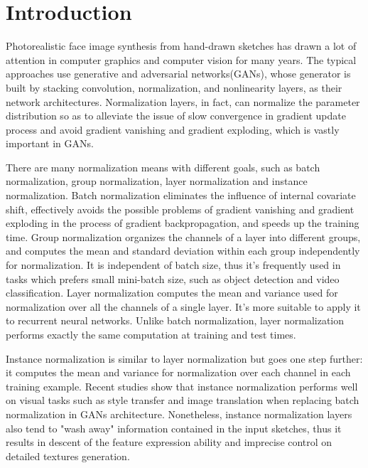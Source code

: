 \documentclass[10pt,twocolumn,letterpaper]{article}
\begin{document}
\section{Introduction}
Photorealistic face image synthesis from hand-drawn sketches has drawn a lot of attention in computer graphics and computer vision for many years. The typical approaches use generative and adversarial networks(GANs)\cite{gan}, whose generator is built by stacking convolution, normalization, and nonlinearity layers, as their network architectures. Normalization layers, in fact, can normalize the parameter distribution so as to alleviate the issue of slow convergence in gradient update process and avoid gradient vanishing and gradient exploding,  which is vastly important in GANs.

There are many normalization means with different goals, such as batch normalization\cite{bn}, group normalization\cite{gn}, layer normalization\cite{ln} and instance normalization\cite{instance_norm}. 
Batch normalization eliminates the influence of internal covariate shift, effectively avoids the possible problems of gradient vanishing and gradient exploding in the process of gradient backpropagation, and speeds up the training time. 
Group normalization organizes the channels of a layer into different groups, and computes the mean and standard deviation within each group independently for normalization. It is independent of batch size, thus it's frequently used in tasks which prefers small mini-batch size, such as object detection and video classification.
Layer normalization computes the mean and variance used for normalization over all the channels of a single layer. It's more suitable to apply it to recurrent neural networks. Unlike batch normalization, layer normalization performs exactly the same computation at training and test times.

Instance normalization is similar to layer normalization but goes one step further: it computes the mean and variance for normalization over each channel in each training example.
Recent studies show that instance normalization performs well on visual tasks such as style transfer and image translation\cite{pix2pixhd,spade,cyclegan} when replacing batch normalization in GANs architecture. 
Nonetheless, instance normalization layers also tend to "wash away" information contained in the input sketches, thus it results in descent of the feature expression ability and imprecise control on detailed textures generation. 
\end{document}
